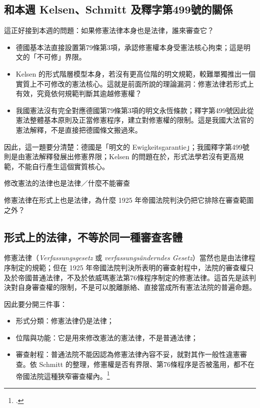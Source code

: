 \subsection{和本週 Kelsen、Schmitt 及釋字第499號的關係}

這正好接到本週的問題：如果修憲法律本身也是法律，誰來審查它？

\begin{itemize}
\tightlist
\item
  德國基本法直接設置第79條第3項，承認修憲權本身受憲法核心拘束；這是明文的「不可修」界限。
\item
  Kelsen 的形式階層模型本身，若沒有更高位階的明文規範，較難單獨推出一個實質上不可修改的憲法核心。這就是前面所說的理論漏洞：修憲法律若形式上有效，究竟依何規範判斷其逾越修憲權？
\item
  我國憲法沒有完全對應德國第79條第3項的明文永恆條款；釋字第499號因此從憲法整體基本原則及正當修憲程序，建立對修憲權的限制。這是我國大法官的憲法解釋，不是直接把德國條文搬過來。
\end{itemize}

因此，這一題要分清楚：德國是「明文的 Ewigkeitsgarantie」；我國釋字第499號則是由憲法解釋發展出修憲界限；Kelsen 的問題在於，形式法學若沒有更高規範，不能自行產生這個實質核心。


\begin{qaprompt}
修改憲法的法律也是法律／什麼不能審查
\end{qaprompt}

\begin{qaquestion}
修憲法律在形式上也是法律，為什麼 1925 年帝國法院判決仍把它排除在審查範圍之外？
\end{qaquestion}

\subsection{形式上的法律，不等於同一種審查客體}

修憲法律（\emph{Verfassungsgesetz} 或 \emph{verfassungsänderndes Gesetz}）當然也是由法律程序制定的規範；但在 1925 年帝國法院判決所表明的審查射程中，法院的審查權只及於帝國普通法律，不及於依威瑪憲法第76條程序制定的修憲法律。這首先是該判決對自身審查權的限制，不是可以脫離脈絡、直接當成所有憲法法院的普遍命題。

因此要分開三件事：

\begin{itemize}
\tightlist
\item
  形式分類：修憲法律仍是法律；
\item
  位階與功能：它是用來修改憲法的憲法律，不是普通法律；
\item
  審查射程：普通法院不能因認為修憲法律內容不妥，就對其作一般性違憲審查。依 Schmitt 的整理，修憲權是否有界限、第76條程序是否被濫用，都不在帝國法院這種狹窄審查權內。\footcites[84]{schmitt2015}[16]{schmitt1931}
\end{itemize}

